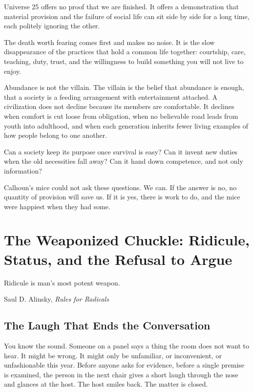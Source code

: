 \documentclass[12pt,a4paper]{book}
\begin{document}
Universe 25 offers no proof that we are finished. It offers a demonstration that material provision and the failure of social life can sit side by side for a long time, each politely ignoring the other.

The death worth fearing comes first and makes no noise. It is the slow disappearance of the practices that hold a common life together: courtship, care, teaching, duty, trust, and the willingness to build something you will not live to enjoy.

Abundance is not the villain. The villain is the belief that abundance is enough, that a society is a feeding arrangement with entertainment attached. A civilization does not decline because its members are comfortable. It declines when comfort is cut loose from obligation, when no believable road leads from youth into adulthood, and when each generation inherits fewer living examples of how people belong to one another.

Can a society keep its purpose once survival is easy? Can it invent new duties when the old necessities fall away? Can it hand down competence, and not only information?

Calhoun's mice could not ask these questions. We can. If the answer is no, no quantity of provision will save us. If it is yes, there is work to do, and the mice were happiest when they had some.


\chapter[The Weaponized Chuckle]{The Weaponized Chuckle: Ridicule, Status, and the Refusal to Argue}

\epigraph{Ridicule is man's most potent weapon.}{Saul D. Alinsky, \emph{Rules for Radicals} \cite{alinsky1971}}

\section{The Laugh That Ends the Conversation}

You know the sound. Someone on a panel says a thing the room does not want to hear. It might be wrong. It might only be unfamiliar, or inconvenient, or unfashionable this year. Before anyone asks for evidence, before a single premise is examined, the person in the next chair gives a short laugh through the nose and glances at the host. The host smiles back. The matter is closed.
\end{document}
